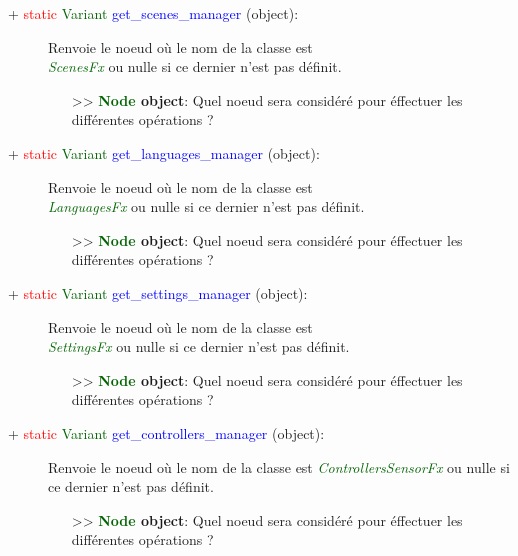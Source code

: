 \documentclass[a4paper, 11pt]{article}
\begin{document}
	\begin{description}
		\item [+ \textcolor{red}{static} \textcolor{darkgreen}{Variant} \textcolor{blue}
		{get\_scenes\_manager} (object):] Renvoie le noeud où le nom de la classe est 
		\textit{\textcolor{darkgreen}{\\ScenesFx}} ou nulle si ce dernier n'est pas définit.
		\begin{itemize}
			\item [>> \textbf{\textcolor{darkgreen}{Node} object}:] Quel noeud sera considéré pour éffectuer
			les différentes opérations ?\\
		\end{itemize}
	\end{description}
	\begin{description}
		\item [+ \textcolor{red}{static} \textcolor{darkgreen}{Variant} \textcolor{blue}
		{get\_languages\_manager} (object):] Renvoie le noeud où le nom de la classe est 
		\textit{\textcolor{darkgreen}{\\LanguagesFx}} ou nulle si ce dernier n'est pas définit.
		\begin{itemize}
			\item [>> \textbf{\textcolor{darkgreen}{Node} object}:] Quel noeud sera considéré pour éffectuer
			les différentes opérations ?\\
		\end{itemize}
	\end{description}
	\begin{description}
		\item [+ \textcolor{red}{static} \textcolor{darkgreen}{Variant} \textcolor{blue}
		{get\_settings\_manager} (object):] Renvoie le noeud où le nom de la classe est 
		\textit{\textcolor{darkgreen}{\\SettingsFx}} ou nulle si ce dernier n'est pas définit.
		\begin{itemize}
			\item [>> \textbf{\textcolor{darkgreen}{Node} object}:] Quel noeud sera considéré pour éffectuer
			les différentes opérations ?\\
		\end{itemize}
	\end{description}
	\begin{description}
		\item [+ \textcolor{red}{static} \textcolor{darkgreen}{Variant} \textcolor{blue}
		{get\_controllers\_manager} (object):] Renvoie le noeud où le nom de la classe est
		\textit{\textcolor{darkgreen}{ControllersSensorFx}} ou nulle si ce dernier n'est pas définit.
		\begin{itemize}
			\item [>> \textbf{\textcolor{darkgreen}{Node} object}:] Quel noeud sera considéré pour éffectuer
			les différentes opérations ?\\
		\end{itemize}
	\end{description}
\end{document}
